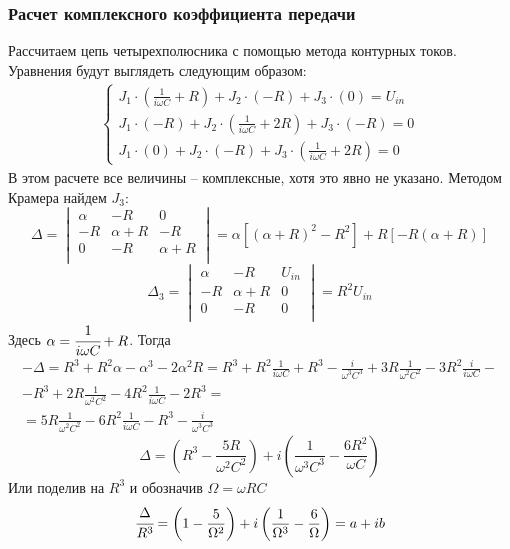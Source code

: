 \subsubsection{Расчет комплексного коэффициента передачи}

Рассчитаем цепь четырехполюсника с помощью метода контурных токов. Уравнения будут выглядеть следующим образом:
\begin{gather}
	\left\{
	\begin{aligned}
		J_1\cdot\left(\frac{1}{i\omega C}+R\right)+J_2\cdot\left( -R \right)+J_3\cdot\left(0 \right)=U_{in} \\
		J_1\cdot\left(-R\right)+J_2\cdot\left( \frac{1}{i\omega C}+2R \right)+J_3\cdot\left(-R \right)=0    \\
		J_1\cdot\left(0\right)+J_2\cdot\left( -R \right)+J_3\cdot\left(\frac{1}{i\omega C}+2R \right)=0
	\end{aligned}
	\right.
\end{gather}
В этом расчете все величины -- комплексные, хотя это явно не указано. Методом Крамера найдем $J_3$:
\begin{equation}
	\Delta =\begin{vmatrix}
		\alpha & -R       & 0        \\
		-R     & \alpha+R & -R       \\
		0      & -R       & \alpha+R \\
	\end{vmatrix}=
	\alpha[(\alpha+R)^2-R^2]+R[-R(\alpha+R)]
\end{equation}
\begin{equation}
	\Delta_3 =\begin{vmatrix}
		\alpha & -R       & U_{in} \\
		-R     & \alpha+R & 0      \\
		0      & -R       & 0      \\
	\end{vmatrix}=
	R^2U_{in}
\end{equation}
Здесь $\alpha=\cfrac{1}{i\omega C}+R$. Тогда
\begin{multline}
	-\Delta=R^3+R^2\alpha-\alpha^3-2\alpha^2R=
	R^3
	+R^2\frac{1}{i\omega C}
	+R^3
	-\frac{i}{\omega^3C^3}
	+3R\frac{1}{\omega^2C^2}
	-3R^2\frac{i}{i\omega C}
	-\\-R^3
	+2R\frac{1}{\omega^2C^2}
	-4R^2\frac{1}{i\omega C}
	-2R^3
	=\\=
	5R\frac{1}{\omega^2C^2}
	-6R^2\frac{1}{i\omega C}
	-R^3
	-\frac{i}{\omega^3 C^3}
\end{multline}
\begin{equation}
	\Delta=
	\left(
	R^3
	-\frac{5R}{\omega^2C^2}
	\right)
	+i
	\left(
	\frac{1}{\omega^3C^3}
	-\frac{6R^2}{\omega C}
	\right)
\end{equation}
Или поделив на $R^3$ и обозначив $\Omega=\omega RC$
\begin{equation}
	\cfrac{\Delta}{R^3}=
	\left(
	1
	-\frac{5}{\Omega^2}
	\right)
	+i
	\left(
	\frac{1}{\Omega^3}
	-\frac{6}{\Omega}
	\right)=a+ib
\end{equation}

